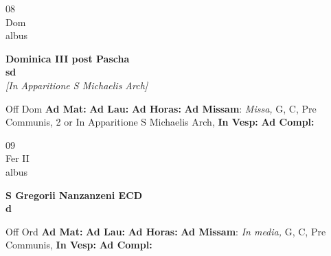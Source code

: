 \documentclass[10pt, openany]{book}
\begin{document}
        \begin{center}
            \begin{minipage}{3.5in}
                \vspace{2em}
                \begin{minipage}{0.5in}
                    {\Huge 08} \\
                    {\normalsize Dom} \\
                    {\normalsize albus}
                \end{minipage}
                \begin{minipage}{3.0in}
                    \textbf{ \large Dominica III post Pascha \\
                    \textnormal{\normalsize sd}} \\ \textit{[In Apparitione S Michaelis Arch]} \\ 
                \end{minipage}
                \begin{justify}Off Dom
                    \textbf{Ad Mat: }
                    \textbf{Ad Lau: }
                    \textbf{Ad Horas: }\textbf{Ad Missam}: \textit{Missa,} G, C, Pre Communis, 2 or In Apparitione S Michaelis Arch,  
                    \textbf{In Vesp: }
                    \textbf{Ad Compl: }
                \end{justify}
            \end{minipage}
        \end{center}
    
        \begin{center}
            \begin{minipage}{3.5in}
                \vspace{2em}
                \begin{minipage}{0.5in}
                    {\Huge 09} \\
                    {\normalsize Fer II} \\
                    {\normalsize albus}
                \end{minipage}
                \begin{minipage}{3.0in}
                    \textbf{ \large S Gregorii Nanzanzeni ECD \\
                    \textnormal{\normalsize d}} \\ 
                \end{minipage}
                \begin{justify}Off Ord
                    \textbf{Ad Mat: }
                    \textbf{Ad Lau: }
                    \textbf{Ad Horas: }\textbf{Ad Missam}: \textit{In media,} G, C, Pre Communis,  
                    \textbf{In Vesp: }
                    \textbf{Ad Compl: }
                \end{justify}
            \end{minipage}
        \end{center}
    
\end{document}
